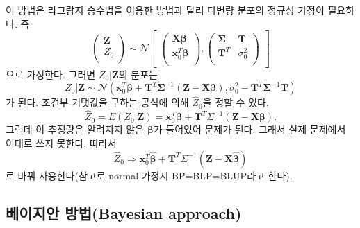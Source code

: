 \documentclass[b5paper,]{scrbook}
\theoremstyle{plain}
\theoremstyle{definition}
\numberwithin{equation}{section}
\begin{document}
이 방법은 라그랑지 승수법을 이용한 방법과 달리 다변량 분포의 정규성 가정이 필요하다. 즉
\[
\begin{pmatrix}
\mathbf{Z}\\
Z_{0}\\
\end{pmatrix}
\sim \mathcal{N}
\begin{bmatrix}
\begin{pmatrix}
\mathbf{X}\boldsymbol{\beta}\\
\mathbf{x}_{0}^{T}\boldsymbol{\beta}\\
\end{pmatrix},
\begin{pmatrix}
\boldsymbol{\Sigma} & \mathbf{T}\\
\mathbf{T}^{T} & \sigma_{0}^{2}\\
\end{pmatrix}
\end{bmatrix}
\]
으로 가정한다. 그러면 \(Z_{0}|\mathbf{Z}\)의 분포는
\[Z_{0}|\mathbf{Z} \sim \mathcal{N}(\mathbf{x}_{0}^{T}\boldsymbol{\beta}+\mathbf{T}^{T}\boldsymbol{\Sigma}^{-1}(\mathbf{Z}-\mathbf{X}\boldsymbol{\beta}), \sigma_{0}^{2}-\mathbf{T}^{T}\boldsymbol{\Sigma}^{-1}\mathbf{T})\]
가 된다. 조건부 기댓값을 구하는 공식에 의해 \(\hat{Z}_{0}\)을 정할 수 있다.
\[\hat{Z}_{0}=E(Z_{0}|\mathbf{Z})=\mathbf{x}_{0}^{T}\boldsymbol{\beta}+\mathbf{T}^{T}\Sigma^{-1}(\mathbf{Z}-\mathbf{X}\boldsymbol{\beta}).\]
그런데 이 추정량은 알려지지 않은 \(\boldsymbol{\beta}\)가 들어있어 문제가 된다. 그래서 실제 문제에서 이대로 쓰지 못한다. 따라서
\[\hat{Z}_{0}\Longrightarrow \mathbf{x}_{0}^{T}\hat{\boldsymbol{\beta}}+\mathbf{T}^{T}\Sigma^{-1}(\mathbf{Z}-\mathbf{X}\hat{\boldsymbol{\beta}})\]
로 바꿔 사용한다(참고로 normal 가정시 BP=BLP=BLUP라고 한다).

\hypertarget{-bayesian-approach}{%
\subsection{베이지안 방법(Bayesian approach)}\label{-bayesian-approach}}
\end{document}
